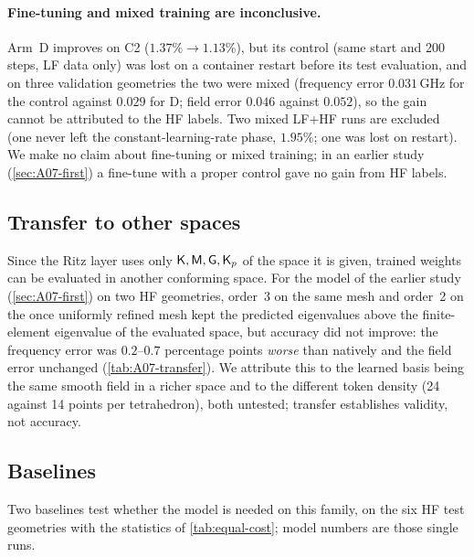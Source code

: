 \paragraph{Fine-tuning and mixed training are inconclusive.} Arm~D improves on C2 ($1.37\%\to1.13\%$), but its control (same start and 200 steps, LF data only) was lost on a container restart before its test evaluation, and on three validation geometries the two were mixed (frequency error $0.031$\,GHz for the control against $0.029$ for D; field error $0.046$ against $0.052$), so the gain cannot be attributed to the HF labels. Two mixed LF+HF runs are excluded (one never left the constant-learning-rate phase, $1.95\%$; one was lost on restart). We make no claim about fine-tuning or mixed training; in an earlier study (\cref{sec:A07-first}) a fine-tune with a proper control gave no gain from HF labels.

\subsection{Transfer to other spaces}\label{sec:07-transfer}
Since the Ritz layer uses only $\Kmat,\Mmat,\Gmat,\Kp$ of the space it is given, trained weights can be evaluated in another conforming space. For the model of the earlier study (\cref{sec:A07-first}) on two HF geometries, order~3 on the same mesh and order~2 on the once uniformly refined mesh kept the predicted eigenvalues above the finite-element eigenvalue of the evaluated space, but accuracy did not improve: the frequency error was $0.2$--$0.7$ percentage points \emph{worse} than natively and the field error unchanged (\cref{tab:A07-transfer}). We attribute this to the learned basis being the same smooth field in a richer space and to the different token density (24 against 14 points per tetrahedron), both untested; transfer establishes validity, not accuracy.

\subsection{Baselines}\label{sec:07-baselines}
Two baselines test whether the model is needed on this family, on the six HF test geometries with the statistics of \cref{tab:equal-cost}; model numbers are those single runs.

